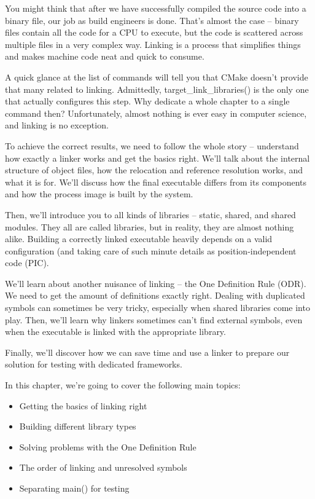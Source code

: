 You might think that after we have successfully compiled the source code into a binary file, our job as build engineers is done. That's almost the case – binary files contain all the code for a CPU to execute, but the code is scattered across multiple files in a very complex way. Linking is a process that simplifies things and makes machine code neat and quick to consume.

A quick glance at the list of commands will tell you that CMake doesn't provide that many related to linking. Admittedly, target\_link\_libraries() is the only one that actually configures this step. Why dedicate a whole chapter to a single command then? Unfortunately, almost nothing is ever easy in computer science, and linking is no exception.

To achieve the correct results, we need to follow the whole story – understand how exactly a linker works and get the basics right. We'll talk about the internal structure of object files, how the relocation and reference resolution works, and what it is for. We'll discuss how the final executable differs from its components and how the process image is built by the system.

Then, we'll introduce you to all kinds of libraries – static, shared, and shared modules.
They all are called libraries, but in reality, they are almost nothing alike. Building a correctly linked executable heavily depends on a valid configuration (and taking care of such minute details as position-independent code (PIC).

We'll learn about another nuisance of linking – the One Definition Rule (ODR). We need to get the amount of definitions exactly right. Dealing with duplicated symbols can sometimes be very tricky, especially when shared libraries come into play. Then, we'll learn why linkers sometimes can't find external symbols, even when the executable is linked with the appropriate library.

Finally, we'll discover how we can save time and use a linker to prepare our solution for testing with dedicated frameworks.

In this chapter, we're going to cover the following main topics:

\begin{itemize}
\item 
Getting the basics of linking right

\item 
Building different library types

\item 
Solving problems with the One Definition Rule

\item 
The order of linking and unresolved symbols

\item 
Separating main() for testing
\end{itemize}